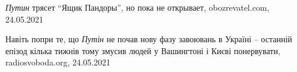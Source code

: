  
 
 
 
 

\emph{Путин} трясет \enquote{Ящик Пандоры}, но пока не открывает,
obozrevatel.com, 24.05.2021

Навіть попри те, що \emph{Путін} не почав нову фазу завоювань в Україні –
останній епізод кілька тижнів тому змусив людей у Вашингтоні і Києві
понервувати, radiosvoboda.org, 24.05.2021
